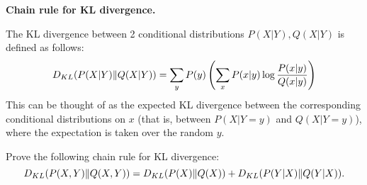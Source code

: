 \item {} \textbf{Chain rule for KL divergence.}

The KL divergence between 2
conditional distributions $P(X|Y),Q(X|Y)$ is defined as follows:
\[
D_{KL}(P(X|Y)\|Q(X|Y))
= \sum_y P(y) \left(\sum_x P(x|y)\log\frac{P(x|y)}{Q(x|y)}\right)
\]
This can be thought of as the expected KL divergence between the
corresponding conditional distributions on $x$ (that is, between
$P(X|Y=y)$ and $Q(X|Y=y)$), where the expectation is taken over the
random $y$.

Prove the following chain rule for KL divergence:
$$ D_{KL}(P(X,Y)\|Q(X,Y)) = D_{KL}(P(X)\|Q(X)) + D_{KL}(P(Y|X)\|Q(Y|X)). $$
